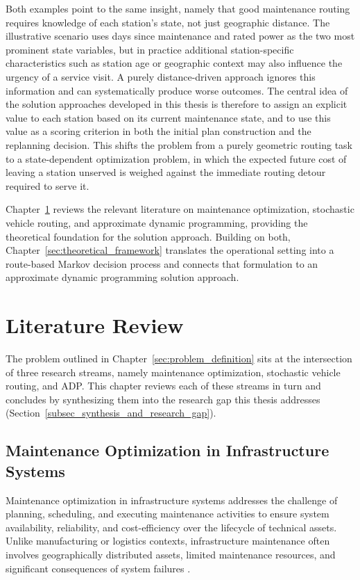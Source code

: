 \documentclass[12pt,oneside]{article}
\begin{document}
Both examples point to the same insight, namely that good maintenance routing requires knowledge of each station's state, not just geographic distance. The illustrative scenario uses days since maintenance and rated power as the two most prominent state variables, but in practice additional station-specific characteristics such as station age or geographic context may also influence the urgency of a service visit. A purely distance-driven approach ignores this information and can systematically produce worse outcomes. The central idea of the solution approaches developed in this thesis is therefore to assign an explicit value to each station based on its current maintenance state, and to use this value as a scoring criterion in both the initial plan construction and the replanning decision. This shifts the problem from a purely geometric routing task to a state-dependent optimization problem, in which the expected future cost of leaving a station unserved is weighed against the immediate routing detour required to serve it.

Chapter~\ref{sec:literature_review} reviews the relevant literature on maintenance optimization, stochastic vehicle routing, and approximate dynamic programming, providing the theoretical foundation for the solution approach. Building on both, Chapter~\ref{sec:theoretical_framework} translates the operational setting into a route-based Markov decision process and connects that formulation to an approximate dynamic programming solution approach.

\FloatBarrier
\section{Literature Review}\label{sec:literature_review}
The problem outlined in Chapter~\ref{sec:problem_definition} sits at the intersection of three research streams, namely maintenance optimization, stochastic vehicle routing, and ADP. This chapter reviews each of these streams in turn and concludes by synthesizing them into the research gap this thesis addresses (Section~\ref{subsec_synthesis_and_research_gap}).

\subsection{Maintenance Optimization in Infrastructure Systems}\label{subsec_maintenance_optimization_in_infrastructure_systems}
Maintenance optimization in infrastructure systems addresses the challenge of planning, scheduling,
and executing maintenance activities to ensure system availability, reliability, and cost-efficiency
over the lifecycle of technical assets.
Unlike manufacturing or logistics contexts, infrastructure maintenance often involves geographically
distributed assets, limited maintenance resources, and significant consequences of system failures
\citep{dejonge2020review}.
\end{document}
